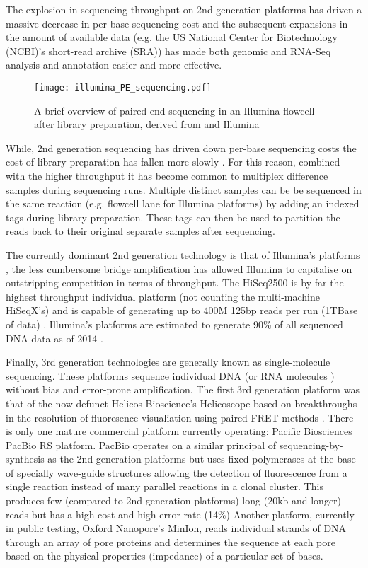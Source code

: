 The explosion in sequencing throughput on 2nd-generation platforms has driven a massive decrease in per-base sequencing cost
and the subsequent expansions in the amount of available data (e.g. the US National Center for Biotechnology (NCBI)'s short-read archive (SRA)) 
has made both genomic and RNA-Seq analysis and annotation easier and more effective. 

\begin{figure}
    \texttt{[image: illumina\_PE\_sequencing.pdf]}
    \label{fig:libseq}
    \caption{A brief overview of paired end sequencing in an Illumina flowcell after library preparation, derived
    from \citep{Mardis2008} and Illumina}
\end{figure}

While, 2nd generation sequencing has driven down per-base sequencing costs the cost of library preparation 
has fallen more slowly \citep{Blainey2013}.
For this reason, combined with the higher throughput it has become common to multiplex difference samples 
during sequencing runs.  Multiple distinct samples can be be sequenced
in the same reaction (e.g. flowcell lane for Illumina platforms) by adding an indexed tags during library
preparation.  These tags can then be used to partition the reads back to their original separate samples
after sequencing. 


The currently dominant 2nd generation technology is that of Illumina's platforms \citep{Regalado2014}, the less cumbersome bridge amplification \citep{Shendure2008} 
has allowed Illumina to capitalise on outstripping competition in terms of throughput.
The HiSeq2500 is by far the highest throughput individual platform (not counting the multi-machine HiSeqX's) and is capable of generating up to 
400M 125bp reads per run (1TBase of data) \citep{Nederbragt2013}.
Illumina's platforms are estimated to generate 90\% of all sequenced DNA data as of 2014 \citep{Regalado2014}.


Finally, 3rd generation technologies are generally known as single-molecule sequencing.
These platforms sequence individual DNA (or RNA molecules \citep{Ozsolak2009}) without
bias and error-prone amplification. 
The first 3rd generation platform was that of the now defunct Helicos Bioscience's Helicoscope \citep{Harris2008}
based on breakthroughs in the resolution of fluoresence visualiation using paired FRET methods \citep{Braslavsky2003}.
There is only one mature commercial platform currently operating: Pacific Biosciences PacBio RS platform. PacBio operates on a similar principal
of sequencing-by-synthesis as the 2nd generation platforms but uses fixed polymerases at the base
of specially wave-guide structures allowing the detection of fluorescence from a single reaction
instead of many parallel reactions in a clonal cluster.  This produces few (compared to 2nd generation 
platforms) long (20kb and longer) reads but has a high cost and high error rate (14\%) \citep{Jaszczyszyn2014}
Another platform, currently in public testing, Oxford Nanopore's MinIon, reads individual strands of DNA through an array of 
pore proteins and determines the sequence at each pore based on the physical
properties (impedance) of a particular set of bases.

